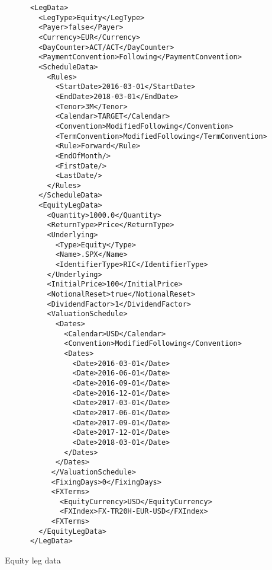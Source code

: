 \begin{listing}[H]
\begin{verbatim}
      <LegData>
        <LegType>Equity</LegType>
        <Payer>false</Payer>
        <Currency>EUR</Currency>
        <DayCounter>ACT/ACT</DayCounter>
        <PaymentConvention>Following</PaymentConvention>
        <ScheduleData>
          <Rules>
            <StartDate>2016-03-01</StartDate>
            <EndDate>2018-03-01</EndDate>
            <Tenor>3M</Tenor>
            <Calendar>TARGET</Calendar>
            <Convention>ModifiedFollowing</Convention>
            <TermConvention>ModifiedFollowing</TermConvention>
            <Rule>Forward</Rule>
            <EndOfMonth/>
            <FirstDate/>
            <LastDate/>
          </Rules>
        </ScheduleData>
        <EquityLegData>
          <Quantity>1000.0</Quantity>
          <ReturnType>Price</ReturnType>
          <Underlying>
            <Type>Equity</Type>
            <Name>.SPX</Name>
            <IdentifierType>RIC</IdentifierType>
          </Underlying>
          <InitialPrice>100</InitialPrice>
          <NotionalReset>true</NotionalReset>
          <DividendFactor>1</DividendFactor>
          <ValuationSchedule>
            <Dates>
              <Calendar>USD</Calendar>
              <Convention>ModifiedFollowing</Convention>
              <Dates>
                <Date>2016-03-01</Date>
                <Date>2016-06-01</Date>
                <Date>2016-09-01</Date>
                <Date>2016-12-01</Date>
                <Date>2017-03-01</Date>
                <Date>2017-06-01</Date>
                <Date>2017-09-01</Date>
                <Date>2017-12-01</Date>
                <Date>2018-03-01</Date>
              </Dates>
            </Dates>
           </ValuationSchedule>
           <FixingDays>0</FixingDays>
           <FXTerms>
             <EquityCurrency>USD</EquityCurrency>
             <FXIndex>FX-TR20H-EUR-USD</FXIndex>
           <FXTerms>
        </EquityLegData>
      </LegData>
\end{verbatim}
\caption{Equity leg data}
\label{lst:equitylegdata}
\end{listing}
